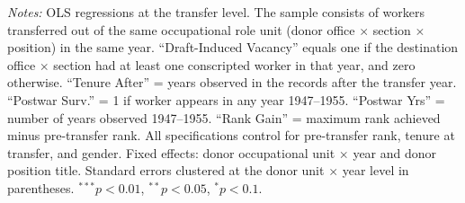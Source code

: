 \begin{table}[htbp]
\begin{threeparttable}
\begin{tablenotes}[flushleft]
\footnotesize
\item \textit{Notes:} OLS regressions at the transfer level. The sample consists of workers transferred out of the same occupational role unit (donor office $\times$ section $\times$ position) in the same year. ``Draft-Induced Vacancy'' equals one if the destination office $\times$ section had at least one conscripted worker in that year, and zero otherwise. ``Tenure After'' = years observed in the records after the transfer year. ``Postwar Surv.'' = 1 if worker appears in any year 1947--1955. ``Postwar Yrs'' = number of years observed 1947--1955. ``Rank Gain'' = maximum rank achieved minus pre-transfer rank. All specifications control for pre-transfer rank, tenure at transfer, and gender. Fixed effects: donor occupational unit $\times$ year and donor position title. Standard errors clustered at the donor unit $\times$ year level in parentheses. $^{***}p<0.01$, $^{**}p<0.05$, $^{*}p<0.1$.
\end{tablenotes}
\end{threeparttable}
\end{table}
